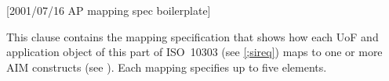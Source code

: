 [2001/07/16 AP mapping spec boilerplate]

  This clause contains the mapping specification that shows how each
UoF and application object of this part of ISO~10303
(see \cref{;sireq}) maps to one or more AIM constructs
(see ).
Each mapping specifies up to five elements.

